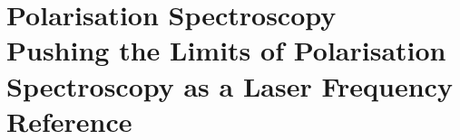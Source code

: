 \part[Polarisation Spectroscopy]{Polarisation Spectroscopy\\
\vspace{1cm}
\LARGE Pushing the Limits of Polarisation Spectroscopy as a Laser Frequency Reference}



